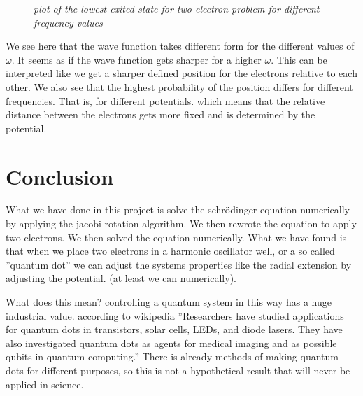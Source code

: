 \documentclass[norsk,a4paper,12pt]{article}
\begin{document}
\begin{figure}[H]
\begin{center}
  \end{center}
 \caption{\textit{plot of the lowest exited state for two electron problem for different frequency values}}
  \label{fig:edge}
\end{figure}

We see here that the wave function takes different form for the different values of $\omega$. It seems as if the wave function gets
sharper for a higher $\omega$. This can be interpreted like we get a sharper defined position for the electrons relative to each other.
We also see that the highest probability of the position differs for different frequencies. That is, for different potentials.
which means that the relative distance between the electrons gets more fixed and is determined by the potential.


\section*{Conclusion}

What we have done in this project is solve the schrödinger equation numerically by applying the jacobi rotation algorithm.
We then rewrote the equation to apply two electrons. We then solved the equation numerically. What we have found is that when we
place two electrons in a harmonic oscillator well, or a so called ''quantum dot'' we can adjust the systems properties like the radial extension by 
adjusting the potential. (at least we can numerically). 

What does this mean? controlling a quantum system in this way has a huge industrial value. according to wikipedia ''Researchers have studied applications for quantum dots in transistors, solar cells, LEDs, and diode lasers. They have also investigated quantum dots as agents for medical imaging and as possible qubits in quantum computing.''
There is already methods of making quantum dots for different purposes, so this is not a hypothetical result that will never be applied in science.
\end{document}
